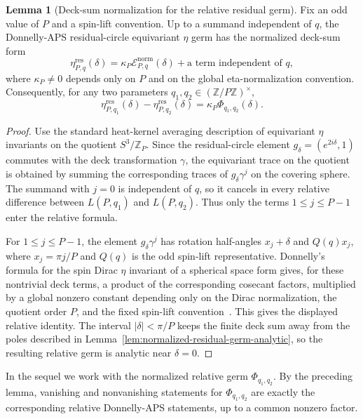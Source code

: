 \documentclass{article}
\theoremstyle{definition}
\newtheorem{lemma}[theorem]{Lemma}
\numberwithin{equation}{section}
\begin{document}
\begin{lemma}[Deck-sum normalization for the relative residual germ]
\label{lem:donnelly-aps-normalization-factor}
Fix an odd value of $P$ and a spin-lift convention.  Up to a summand independent of $q$, the Donnelly-APS residual-circle equivariant $\eta$ germ has the normalized deck-sum form
\begin{equation}
\eta^{\text{res}}_{P,q}(\delta)
=
\kappa_P\mathcal E^{\text{norm}}_{P,q}(\delta)
+
\text{a term independent of }q,
\end{equation}
where $\kappa_P\neq 0$ depends only on $P$ and on the global eta-normalization convention.  Consequently, for any two parameters $q_1,q_2\in(\mathbb Z/P\mathbb Z)^\times$,
\begin{equation}
\eta^{\text{res}}_{P,q_1}(\delta)
-
\eta^{\text{res}}_{P,q_2}(\delta)
=
\kappa_P\Phi_{q_1,q_2}(\delta).
\end{equation}
\end{lemma}

\begin{proof}
Use the standard heat-kernel averaging description of equivariant $\eta$ invariants on the quotient $S^3/\mathbb Z_P$.  Since the residual-circle element $g_\delta=(e^{2i\delta},1)$ commutes with the deck transformation $\gamma$, the equivariant trace on the quotient is obtained by summing the corresponding traces of $g_\delta\gamma^j$ on the covering sphere.  The summand with $j=0$ is independent of $q$, so it cancels in every relative difference between $L(P,q_1)$ and $L(P,q_2)$.  Thus only the terms $1\leq j\leq P-1$ enter the relative formula.

For $1\leq j\leq P-1$, the element $g_\delta\gamma^j$ has rotation half-angles $x_j+\delta$ and $Q(q)x_j$, where $x_j=\pi j/P$ and $Q(q)$ is the odd spin-lift representative.  Donnelly's formula for the spin Dirac $\eta$ invariant of a spherical space form gives, for these nontrivial deck terms, a product of the corresponding cosecant factors, multiplied by a global nonzero constant depending only on the Dirac normalization, the quotient order $P$, and the fixed spin-lift convention~\cite{DonnellyGSpaces}.  This gives the displayed relative identity.  The interval $|\delta|<\pi/P$ keeps the finite deck sum away from the poles described in Lemma~\ref{lem:normalized-residual-germ-analytic}, so the resulting relative germ is analytic near $\delta=0$.
\end{proof}

In the sequel we work with the normalized relative germ $\Phi_{q_1,q_2}$.  By the preceding lemma, vanishing and nonvanishing statements for $\Phi_{q_1,q_2}$ are exactly the corresponding relative Donnelly-APS statements, up to a common nonzero factor.
\end{document}
